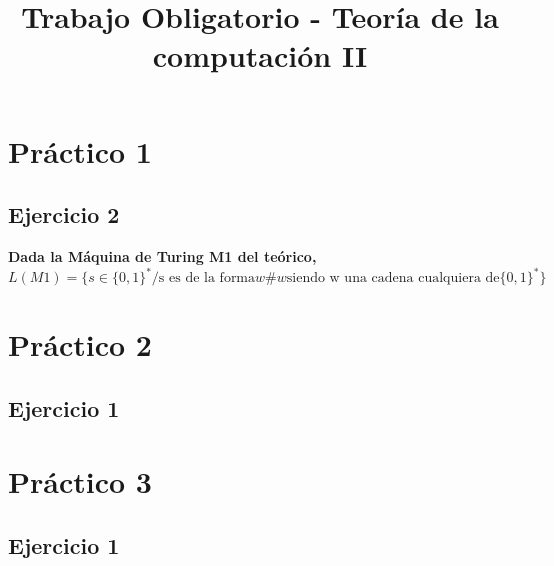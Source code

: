 \documentclass[]{article}
\title{Trabajo Obligatorio - Teoría de la computación II}
\begin{document}
\maketitle
\newpage

\section*{Práctico 1}
\subsection*{Ejercicio 2}
\textbf{Dada la Máquina de Turing M1 del teórico, $L(M1) = \{ s \in \{0,1\}^{*} / \text{s es de la forma} w \# w \text{siendo w una cadena cualquiera de} \{0,1\}^{*} \}$ }\newline

\section*{Práctico 2}
\subsection*{Ejercicio 1}
\section*{Práctico 3}
\subsection*{Ejercicio 1}
\end{document}
